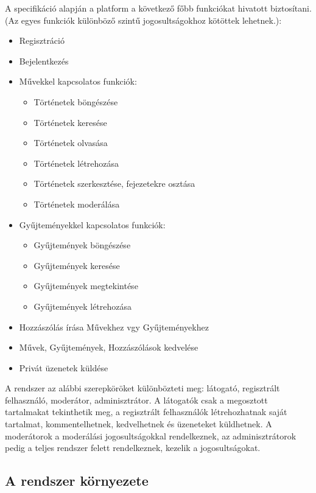 A specifikáció alapján a platform a következő főbb funkciókat hivatott biztosítani. 
(Az egyes funkciók különböző szintű jogosultságokhoz kötöttek lehetnek.):
\begin{itemize}
    \item  Regisztráció
    \item  Bejelentkezés
    \item  Művekkel kapcsolatos funkciók:
    \begin{itemize}
        \item Történetek böngészése
        \item Történetek keresése
        \item Történetek olvasása
        \item Történetek létrehozása
        \item Történetek szerkesztése, fejezetekre osztása
        \item Történetek moderálása

    \end{itemize}
    \item  Gyűjteményekkel kapcsolatos funkciók:
    \begin{itemize}
        \item Gyűjtemények böngészése
        \item Gyűjtemények keresése
        \item Gyűjtemények megtekintése
        \item Gyűjtemények létrehozása 
    \end{itemize}
    \item  Hozzászólás írása Művekhez vgy Gyűjteményekhez
    \item  Művek, Gyűjtemények, Hozzászólások kedvelése
    \item  Privát üzenetek küldése
\end{itemize}

A rendszer az alábbi szerepköröket különbözteti meg: látogató, regisztrált felhasználó, moderátor, adminisztrátor. 
A látogatók csak a megosztott tartalmakat tekinthetik meg, a regisztrált felhasználók létrehozhatnak saját tartalmat, kommentelhetnek, kedvelhetnek és üzeneteket küldhetnek.
A moderátorok a moderálási jogosultságokkal rendelkeznek, az adminisztrátorok pedig a teljes rendszer felett rendelkeznek, kezelik a jogosultságokat.

\subsection{A rendszer környezete}

